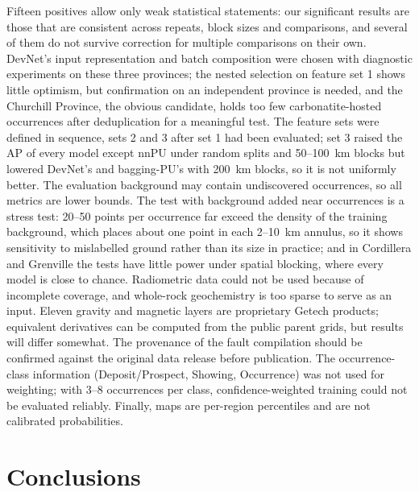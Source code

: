 \documentclass[pdflatex,sn-apa]{sn-jnl}
\begin{document}
Fifteen positives allow only weak statistical statements: our significant results are those that are consistent across repeats, block sizes and comparisons, and several of them do not survive correction for multiple comparisons on their own. DevNet's input representation and batch composition were chosen with diagnostic experiments on these three provinces; the nested selection on feature set 1 shows little optimism, but confirmation on an independent province is needed, and the Churchill Province, the obvious candidate, holds too few carbonatite-hosted occurrences after deduplication for a meaningful test. The feature sets were defined in sequence, sets 2 and 3 after set 1 had been evaluated; set 3 raised the AP of every model except nnPU under random splits and 50--100~km blocks but lowered DevNet's and bagging-PU's with 200~km blocks, so it is not uniformly better. The evaluation background may contain undiscovered occurrences, so all metrics are lower bounds. The test with background added near occurrences is a stress test: 20--50 points per occurrence far exceed the density of the training background, which places about one point in each 2--10~km annulus, so it shows sensitivity to mislabelled ground rather than its size in practice; and in Cordillera and Grenville the tests have little power under spatial blocking, where every model is close to chance. Radiometric data could not be used because of incomplete coverage, and whole-rock geochemistry is too sparse to serve as an input. Eleven gravity and magnetic layers are proprietary Getech products; equivalent derivatives can be computed from the public parent grids, but results will differ somewhat. The provenance of the fault compilation should be confirmed against the original data release before publication. The occurrence-class information (Deposit/Prospect, Showing, Occurrence) was not used for weighting; with 3--8 occurrences per class, confidence-weighted training could not be evaluated reliably. Finally, maps are per-region percentiles and are not calibrated probabilities.

\section{Conclusions}\label{sec:conclusions}
\end{document}
